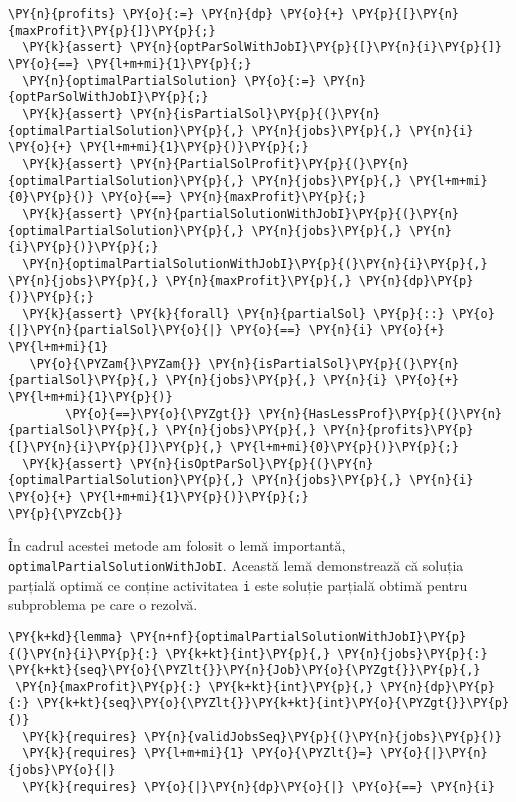 \begin{itemize}
\begin{Verbatim}[commandchars=\\\{\}, fontsize=\footnotesize]
  \PY{n}{profits} \PY{o}{:=} \PY{n}{dp} \PY{o}{+} \PY{p}{[}\PY{n}{maxProfit}\PY{p}{]}\PY{p}{;}
  \PY{k}{assert} \PY{n}{optParSolWithJobI}\PY{p}{[}\PY{n}{i}\PY{p}{]} \PY{o}{==} \PY{l+m+mi}{1}\PY{p}{;}
  \PY{n}{optimalPartialSolution} \PY{o}{:=} \PY{n}{optParSolWithJobI}\PY{p}{;} 
  \PY{k}{assert} \PY{n}{isPartialSol}\PY{p}{(}\PY{n}{optimalPartialSolution}\PY{p}{,} \PY{n}{jobs}\PY{p}{,} \PY{n}{i} \PY{o}{+} \PY{l+m+mi}{1}\PY{p}{)}\PY{p}{;}
  \PY{k}{assert} \PY{n}{PartialSolProfit}\PY{p}{(}\PY{n}{optimalPartialSolution}\PY{p}{,} \PY{n}{jobs}\PY{p}{,} \PY{l+m+mi}{0}\PY{p}{)} \PY{o}{==} \PY{n}{maxProfit}\PY{p}{;}
  \PY{k}{assert} \PY{n}{partialSolutionWithJobI}\PY{p}{(}\PY{n}{optimalPartialSolution}\PY{p}{,} \PY{n}{jobs}\PY{p}{,} \PY{n}{i}\PY{p}{)}\PY{p}{;}
  \PY{n}{optimalPartialSolutionWithJobI}\PY{p}{(}\PY{n}{i}\PY{p}{,} \PY{n}{jobs}\PY{p}{,} \PY{n}{maxProfit}\PY{p}{,} \PY{n}{dp}\PY{p}{)}\PY{p}{;}
  \PY{k}{assert} \PY{k}{forall} \PY{n}{partialSol} \PY{p}{::} \PY{o}{|}\PY{n}{partialSol}\PY{o}{|} \PY{o}{==} \PY{n}{i} \PY{o}{+} \PY{l+m+mi}{1}  
   \PY{o}{\PYZam{}\PYZam{}} \PY{n}{isPartialSol}\PY{p}{(}\PY{n}{partialSol}\PY{p}{,} \PY{n}{jobs}\PY{p}{,} \PY{n}{i} \PY{o}{+} \PY{l+m+mi}{1}\PY{p}{)}
        \PY{o}{==}\PY{o}{\PYZgt{}} \PY{n}{HasLessProf}\PY{p}{(}\PY{n}{partialSol}\PY{p}{,} \PY{n}{jobs}\PY{p}{,} \PY{n}{profits}\PY{p}{[}\PY{n}{i}\PY{p}{]}\PY{p}{,} \PY{l+m+mi}{0}\PY{p}{)}\PY{p}{;}
  \PY{k}{assert} \PY{n}{isOptParSol}\PY{p}{(}\PY{n}{optimalPartialSolution}\PY{p}{,} \PY{n}{jobs}\PY{p}{,} \PY{n}{i} \PY{o}{+} \PY{l+m+mi}{1}\PY{p}{)}\PY{p}{;}
\PY{p}{\PYZcb{}}
\end{Verbatim}
În cadrul acestei metode am folosit o lemă importantă, \\\texttt{optimalPartialSolutionWithJobI}. Această lemă demonstrează că soluția parțială optimă ce conține activitatea \texttt{i} este soluție parțială obtimă pentru subproblema pe care o rezolvă.
\begin{Verbatim}[commandchars=\\\{\},fontsize=\footnotesize]
\PY{k+kd}{lemma} \PY{n+nf}{optimalPartialSolutionWithJobI}\PY{p}{(}\PY{n}{i}\PY{p}{:} \PY{k+kt}{int}\PY{p}{,} \PY{n}{jobs}\PY{p}{:} \PY{k+kt}{seq}\PY{o}{\PYZlt{}}\PY{n}{Job}\PY{o}{\PYZgt{}}\PY{p}{,}
 \PY{n}{maxProfit}\PY{p}{:} \PY{k+kt}{int}\PY{p}{,} \PY{n}{dp}\PY{p}{:} \PY{k+kt}{seq}\PY{o}{\PYZlt{}}\PY{k+kt}{int}\PY{o}{\PYZgt{}}\PY{p}{)}
  \PY{k}{requires} \PY{n}{validJobsSeq}\PY{p}{(}\PY{n}{jobs}\PY{p}{)}
  \PY{k}{requires} \PY{l+m+mi}{1} \PY{o}{\PYZlt{}=} \PY{o}{|}\PY{n}{jobs}\PY{o}{|}
  \PY{k}{requires} \PY{o}{|}\PY{n}{dp}\PY{o}{|} \PY{o}{==} \PY{n}{i}

\end{Verbatim}
\end{itemize}

